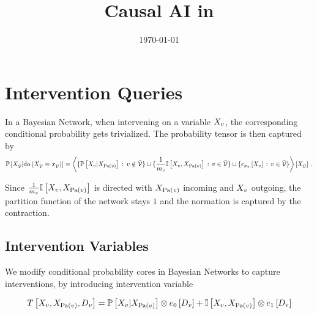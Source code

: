 \documentclass[aps,onecolumn,nofootinbib,pra]{article}
\newcommand{\doof}[1]{\mathrm{do}\left(#1\right)}
\newcommand{\dovariable}{D}
\newcommand{\dovariableof}[1]{\dovariable_{#1}}
\begin{document}
    \title{Causal AI in \tnreason}

    \maketitle
    \date{\today}


    \section{Intervention Queries}

    In a Bayesian Network, when intervening on a variable $X_{v}$, the corresponding conditional probability gets trivialized.
    The probability tensor is then captured by
    \begin{align*}
        \condprobat{\catvariableof{\secnodes}}{\doof{\indexedcatvariableof{\thirdnodes}}}
        = \contractionof{
            \{\condprobof{\catvariableof{\node}}{\catvariableof{\parentsof{\node}}} \,:\, \node\notin\thirdnodes \}
            \cup \{\frac{1}{\catdimof{\node}} \onesat{\catvariableof{\node},\catvariableof{\parentsof{\node}}} \,:\, \node\in\thirdnodes\}
            \cup \{\onehotmapofat{\catindexof{\node}}{\catvariableof{\node}} \,:\, \node\in\thirdnodes\}
        }{\catvariableof{\secnodes}} \, .
    \end{align*}

    Since $\frac{1}{m_{v}} \mathbb{I}\left[X_{v},X_{\mathrm{Pa}(v)}\right]$ is directed with $X_{\mathrm{Pa}(v)}$ incoming and $X_{v}$ outgoing, the partition function of the network stays $1$ and the normation is captured by the contraction.

    \subsection{Intervention Variables}

    We modify conditional probability cores in Bayesian Networks to capture interventions, by introducing intervention variable

    \begin{align*}
        \hypercoreat{\catvariableof{\node},\catvariableof{\parentsof{\node}},\dovariableof{\node}}
        = \condprobat{\catvariableof{\node}}{\catvariableof{\parentsof{\node}}} \otimes \onehotmapofat{0}{\dovariableof{\node}}
        + \onesat{\catvariableof{\node},\catvariableof{\parentsof{\node}}} \otimes \onehotmapofat{1}{\dovariableof{\node}}
    \end{align*}
\end{document}
